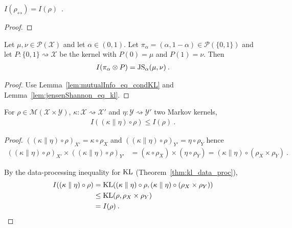 \begin{lemma}
  \label{lem:mutualInfo_symm}
  $I(\rho_\leftrightarrow) = I(\rho)$~.
\end{lemma}

\begin{proof}%
{}

\end{proof}


\begin{lemma}
  \label{lem:mutualInfo_eq_jensenShannon}
  Let $\mu, \nu \in \mathcal P(\mathcal X)$ and let $\alpha \in (0, 1)$. Let $\pi_\alpha = (\alpha, 1 - \alpha) \in \mathcal P(\{0,1\})$ and let $P : \{0,1\} \rightsquigarrow \mathcal X$ be the kernel with $P(0) = \mu$ and $P(1) = \nu$. Then
  \begin{align*}
  I(\pi_\alpha \otimes P) = \operatorname{JS}_\alpha(\mu, \nu) \: .
  \end{align*}
\end{lemma}

\begin{proof}%
{}
Use Lemma~\ref{lem:mutualInfo_eq_condKL} and Lemma~\ref{lem:jensenShannon_eq_kl}.
\end{proof}


\begin{theorem}
  \label{thm:mutualInfo_data_proc}
  For $\rho \in \mathcal M(\mathcal X \times \mathcal Y)$, $\kappa : \mathcal X \rightsquigarrow \mathcal X'$ and $\eta : \mathcal Y \rightsquigarrow \mathcal Y'$ two Markov kernels,
  \begin{align*}
  I((\kappa \parallel \eta) \circ \rho) \le I(\rho) \: .
  \end{align*}
\end{theorem}

\begin{proof}%
{}
$((\kappa \parallel \eta) \circ \rho)_{X'} = \kappa \circ \rho_X$ and $((\kappa \parallel \eta) \circ \rho)_{Y'} = \eta \circ \rho_Y$ hence
\begin{align*}
((\kappa \parallel \eta) \circ \rho)_{X'} \times ((\kappa \parallel \eta) \circ \rho)_{Y'}
&= (\kappa \circ \rho_X) \times (\eta \circ \rho_Y)
= (\kappa \parallel \eta) \circ (\rho_X \times \rho_Y)
\: .
\end{align*}

By the data-processing inequality for $\operatorname{KL}$ (Theorem~\ref{thm:kl_data_proc}),
\begin{align*}
I((\kappa \parallel \eta) \circ \rho)
&= \operatorname{KL}((\kappa \parallel \eta) \circ \rho, (\kappa \parallel \eta) \circ (\rho_X \times \rho_Y))
\\
&\le \operatorname{KL}(\rho, \rho_X \times \rho_Y)
\\
&= I(\rho)
\: .
\end{align*}
\end{proof}

